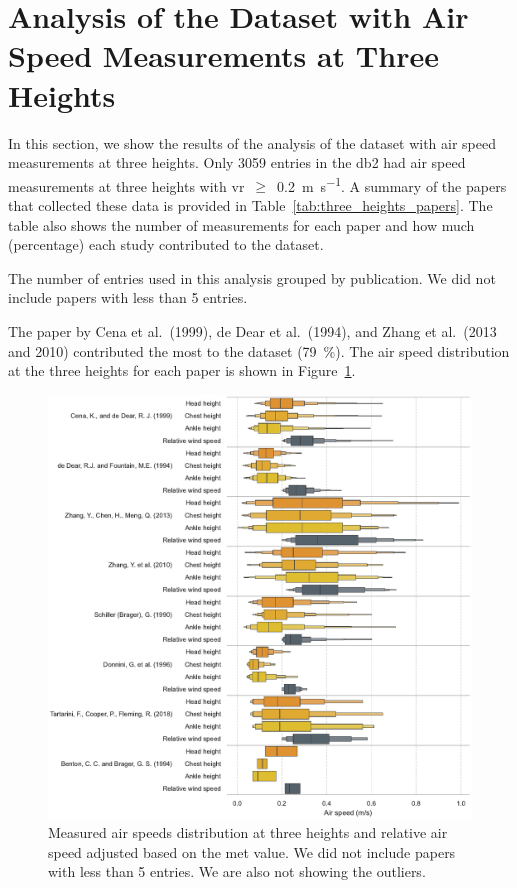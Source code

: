 \appendix

\section{Analysis of the Dataset with Air Speed Measurements at Three Heights}\label{sec:analysis-of-the-dataset-with-air-speed-measurements-at-three-heights}

In this section, we show the results of the analysis of the dataset with air speed measurements at three heights.
Only \num{3059} entries in the \ac{db2} had air speed measurements at three heights with \ac{vr}~$\geq$~\qty{0.2}{\m\per\s}.
A summary of the papers that collected these data is provided in Table~\ref{tab:three_heights_papers}.
The table also shows the number of measurements for each paper and how much (percentage) each study contributed to the dataset.
\begin{table}[htb!]
    \centering
    
    \caption{The number of entries used in this analysis grouped by publication.
    We did not include papers with less than \num{5} entries.}
    \label{tab:three_heights_papers}
\end{table}
The paper by Cena et al.\ (1999), de Dear et al.\ (1994), and Zhang et al.\ (2013 and 2010) contributed the most to the dataset (\qty{79}{\percent}).
The air speed distribution at the three heights for each paper is shown in Figure~\ref{fig:boxenplot_wind_speed_three_heights}.
\begin{figure}[htb!]
    \centering
    \includegraphics[width=\textwidth]{figures/boxenplot_wind_speed_three_heights}
    \caption{Measured air speeds distribution at three heights and relative air speed adjusted based on the \ac{met} value.
    We did not include papers with less than \num{5} entries.
    We are also not showing the outliers.}
    \label{fig:boxenplot_wind_speed_three_heights}
\end{figure}
